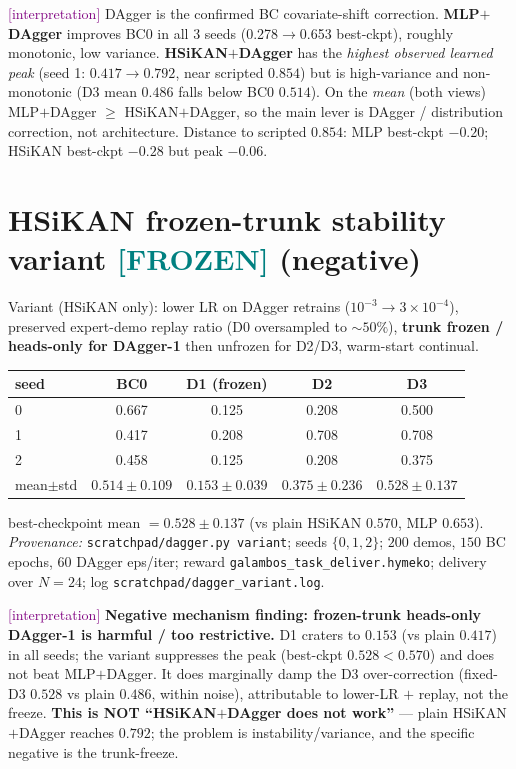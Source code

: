 \documentclass[11pt]{article}
\newcommand{\interp}{\textcolor{purple}{[interpretation]}}
\newcommand{\frozen}{\textcolor{teal}{\textbf{[FROZEN]}}}
\newcommand{\fn}[1]{\texttt{#1}}
\begin{document}
\interp{} DAgger is the confirmed BC covariate-shift correction. \textbf{MLP$+$DAgger} improves BC0 in all 3 seeds
(0.278$\to$0.653 best-ckpt), roughly monotonic, low variance. \textbf{HSiKAN$+$DAgger} has the \emph{highest
observed learned peak} (seed 1: $0.417\to0.792$, near scripted $0.854$) but is high-variance and non-monotonic
(D3 mean $0.486$ falls below BC0 $0.514$). On the \emph{mean} (both views) MLP$+$DAgger $\ge$ HSiKAN$+$DAgger, so
the main lever is DAgger / distribution correction, not architecture. Distance to scripted $0.854$: MLP best-ckpt
$-0.20$; HSiKAN best-ckpt $-0.28$ but peak $-0.06$.

\section{HSiKAN frozen-trunk stability variant \frozen{} (negative)}
Variant (HSiKAN only): lower LR on DAgger retrains ($10^{-3}\to3\times10^{-4}$), preserved expert-demo replay
ratio (D0 oversampled to $\sim50\%$), \textbf{trunk frozen / heads-only for DAgger-1} then unfrozen for D2/D3,
warm-start continual.

\begin{center}\begin{tabular}{lcccc}
\toprule
seed & BC0 & D1 (frozen) & D2 & D3\\
\midrule
0 & 0.667 & 0.125 & 0.208 & 0.500\\
1 & 0.417 & 0.208 & 0.708 & 0.708\\
2 & 0.458 & 0.125 & 0.208 & 0.375\\
\midrule
mean$\pm$std & $0.514\pm0.109$ & $\mathbf{0.153\pm0.039}$ & $0.375\pm0.236$ & $0.528\pm0.137$\\
\bottomrule
\end{tabular}\end{center}
best-checkpoint mean $=0.528\pm0.137$ (vs plain HSiKAN $0.570$, MLP $0.653$).
\emph{Provenance:} \fn{scratchpad/dagger.py variant}; seeds $\{0,1,2\}$; $200$ demos, $150$ BC epochs, $60$ DAgger
eps/iter; reward \fn{galambos\_task\_deliver.hymeko}; delivery over $N=24$; log \fn{scratchpad/dagger\_variant.log}.

\interp{} \textbf{Negative mechanism finding: frozen-trunk heads-only DAgger-1 is harmful / too restrictive.} D1
craters to $0.153$ (vs plain $0.417$) in all seeds; the variant suppresses the peak (best-ckpt $0.528<0.570$) and
does not beat MLP$+$DAgger. It does marginally damp the D3 over-correction (fixed-D3 $0.528$ vs plain $0.486$,
within noise), attributable to lower-LR $+$ replay, not the freeze. \textbf{This is NOT ``HSiKAN$+$DAgger does not
work''} --- plain HSiKAN$+$DAgger reaches $0.792$; the problem is instability/variance, and the specific negative
is the trunk-freeze.
\end{document}
